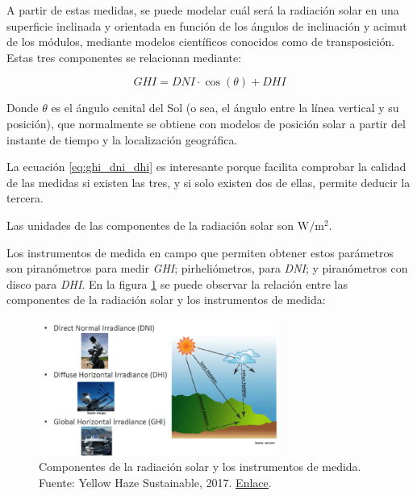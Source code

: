 A partir de estas medidas, se puede modelar cuál será la radiación solar en una superficie inclinada y orientada en función de los ángulos de inclinación y \gls{acimut} de los módulos, mediante modelos científicos conocidos como de \gls{transposición}. Estas tres componentes se relacionan mediante:

\begin{equation} \label{eq:ghi_dni_dhi}
      GHI = DNI \cdot \cos(\theta) + DHI
\end{equation}

Donde $\theta$ es el ángulo cenital del Sol (o sea, el ángulo entre la línea vertical y su posición), que normalmente se obtiene con modelos de posición solar a partir del instante de tiempo y la localización geográfica.

La ecuación \ref{eq:ghi_dni_dhi} es interesante porque facilita comprobar la calidad de las medidas si existen las tres, y si solo existen dos de ellas, permite deducir la tercera.

Las unidades de las componentes de la radiación solar son $\si{\watt\per\meter\squared}$.

Los instrumentos de medida en campo que permiten obtener estos parámetros son \gls{piranómetros} para medir \textit{\gls{GHI}}; \gls{pirheliómetros}, para \textit{\gls{DNI}}; y \gls{piranómetros} con disco para \textit{\gls{DHI}}. En la figura \ref{fig:irrad_componentes} se puede observar la relación entre las componentes de la radiación solar y los instrumentos de medida:

\begin{figure}[H]
      \centering
      \includegraphics[width=0.7\textwidth]{./images/SoA_irrad/dni-dhi-ghi-1-768x437.png}
      \caption{Componentes de la radiación solar y los instrumentos de medida. Fuente: Yellow Haze Sustainable, 2017. \href{http://web.archive.org/web/20230624215046/https://yellowhaze.in/wp-content/uploads/2017/01/dni-dhi-ghi-1-768x437.png}{Enlace}.}
      \label{fig:irrad_componentes}
\end{figure}


